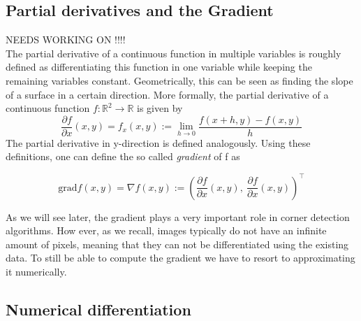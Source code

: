 \subsection*{Partial derivatives and the Gradient}
NEEDS WORKING ON !!!!\\
The partial derivative of a continuous function in multiple variables is roughly defined as differentiating 
this function in one variable while keeping the remaining variables constant. Geometrically, this
can be seen as finding the slope of a surface in a certain direction. More formally, the partial
derivative of a continuous function $f:\mathbb{R}^2\rightarrow\mathbb{R}$ is given by
\begin{equation}
    \frac{\partial f}{\partial x} (x, y) = f_x(x, y) := \lim_{h\rightarrow0}\frac{f(x+h,y) -
        f(x,y)}{h}
\end{equation}
The partial derivative in y-direction is defined analogously.
Using these definitions, one can define the so called \textit{gradient} of f as

\begin{equation}
    \text{grad} f(x, y)= \nabla f(x, y):= \left( \frac{\partial f}{\partial x}(x,y),\ \frac{\partial
            f}{\partial x}(x,y)\right)^\top
\end{equation}

As we will see later, the gradient plays a very important role in corner detection algorithms. 
How ever, as we recall, images typically do not have an infinite amount of pixels, meaning that 
they
can not be differentiated using the existing data. To
still be able to compute the gradient we have to resort to approximating it numerically.

\subsection*{Numerical differentiation}

